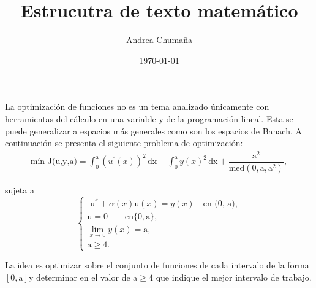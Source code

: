 \documentclass[a5paper, 10pt]{article}
\author{Andrea Chumaña}
\title{Estrucutra de texto matemático}
\date{\today}
\begin{document}
\maketitle
La optimización de funciones no es un tema analizado únicamente con herramientas del cálculo en una variable y de la programación lineal. Esta se puede generalizar a espacios más generales como son los espacios de Banach. A continuación se presenta el siguiente problema de optimización:
\begin{align}
\text{mín J(u,y,a)} =
\int_{0}^{\text {a}} \left(u^{'}(x)\right)^2 \, \text{dx} + \int_{0}^{\text {a}} y(x)^2 \, \text{dx} +
\dfrac{\text{a}^2}{\text{med}(0, \text{a}, \text{a}^2)},
\end{align}
\begin{center}
sujeta a 
 \begin{equation*}
\left\lbrace
\begin{array}{ll}
\text{-u}^{''} + \alpha (x) \text{u}(x)= y(x) \quad \text{en (0, a)},\\
\text{u}= 0	\qquad  \text{en} \big\{0, \text{a}\big\},\\
	\displaystyle \lim_{x\to 0} y(x)= \text{a},\\
	\text{a} \geq 4. 
\end{array}
\right.
\end{equation*}
\end{center}

La idea es optimizar sobre el conjunto de funciones de cada intervalo de la forma \([0,\text{a}]\)y determinar en el valor de \(\text{a} \geq 4\) que indique el mejor intervalo de trabajo.
 
\end{document}
